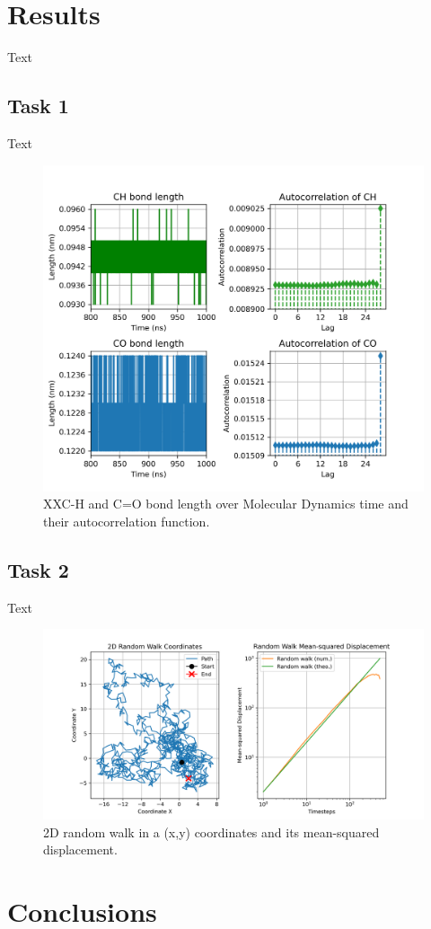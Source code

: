 \documentclass{article}
\begin{document}
\section{Results}

Text

\subsection{Task 1}

Text 

\begin{figure}[H]
\includegraphics[width=\linewidth]{CO_CH_length_acf_plot.png}
\caption{XXC-H and C=O bond length over Molecular Dynamics time and their autocorrelation function.}
\label{acf_plot}
\end{figure}




\subsection{Task 2}


Text

\begin{figure}[H]
\includegraphics[width=\linewidth]{msd_plot.png}
\caption{2D random walk in a (x,y) coordinates and its mean-squared displacement.}
\label{msd_plot}
\end{figure}



\section{Conclusions}



\end{document}
